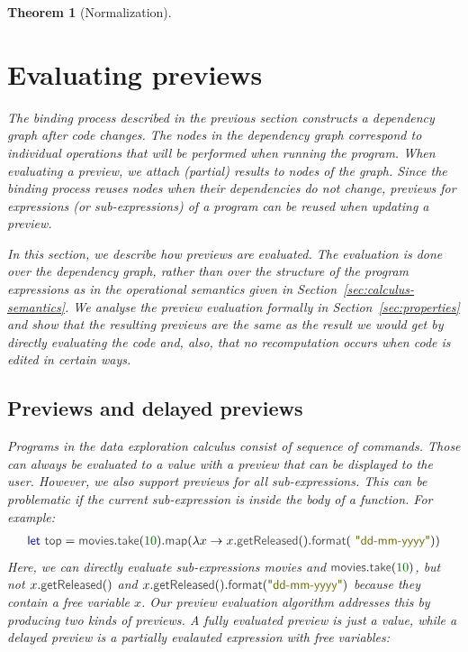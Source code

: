 \documentclass[acmsmall,anonymous,fleqn]{acmart}\settopmatter{printfolios=false,printccs=false,printacmref=false}
\newcounter{thc}
\theoremstyle{plain}
\newtheorem{theorem}[thc]{Theorem}
\theoremstyle{definition}
\newcommand{\num}[1]{\textcolor{numclr}{#1}}
\newcommand{\str}[1]{\textnormal{\textcolor{strclr}{\sffamily "#1"}}}
\newcommand{\ident}[1]{\textnormal{\textcolor{idclr}{\sffamily #1}}}
\newcommand{\kvd}[1]{\textnormal{\textcolor{kvdclr}{\sffamily #1}}}
\begin{document}
\begin{theorem}[Normalization]

\section{Evaluating previews}
\label{sec:previews}

The binding process described in the previous section constructs a dependency graph after code
changes. The nodes in the dependency graph correspond to individual operations that will be performed
when running the program. When evaluating a preview, we attach (partial) results to
nodes of the graph. Since the binding process reuses nodes when their dependencies do not change,
previews for expressions (or sub-expressions) of a program can be reused when updating a preview.

In this section, we describe how previews are evaluated. The evaluation is done over the dependency
graph, rather than over the structure of the program expressions as in the operational semantics
given in Section~\ref{sec:calculus-semantics}. We analyse the preview evaluation formally in
Section~\ref{sec:properties} and show that the resulting previews are the same as the result we
would get by directly evaluating the code and, also, that no recomputation occurs when code is
edited in certain ways.


\subsection{Previews and delayed previews}

Programs in the data exploration calculus consist of sequence of commands. Those can always be
evaluated to a value with a preview that can be displayed to the user. However, we also support
previews for all sub-expressions. This can be problematic if the current sub-expression is inside
the body of a function. For example:
%
\begin{equation*}
\begin{array}{l}
\kvd{let}~\ident{top} = \ident{movies}.\ident{take}(\num{10}).\ident{map}(\lambda x \rightarrow x.\ident{getReleased}().\ident{format}(\str{dd-mm-yyyy}))
\end{array}
\end{equation*}
%
Here, we can directly evaluate sub-expressions \ident{movies} and $\ident{movies}.\ident{take}(\num{10})$,
but not $x.\ident{getReleased}()$ and $x.\ident{getReleased}().\ident{format}(\str{dd-mm-yyyy})$
because they contain a free variable $x$. Our preview evaluation algorithm addresses this by
producing two kinds of previews. A \emph{fully evaluated preview} is just a value, while
a \emph{delayed preview} is a partially evalauted expression with free variables:


\end{theorem}
\end{document}
